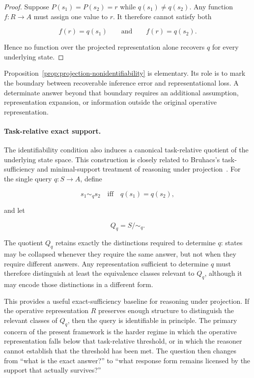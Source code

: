 \documentclass[11pt]{article}
\theoremstyle{definition}
\theoremstyle{remark}
\begin{document}
\begin{proof}
Suppose \(P(s_1)=P(s_2)=r\) while \(q(s_1)\neq q(s_2)\). Any function \(f:R\rightarrow A\) must assign one value to \(r\). It therefore cannot satisfy both

\[
f(r)=q(s_1)
\qquad\text{and}\qquad
f(r)=q(s_2).
\]

Hence no function over the projected representation alone recovers \(q\) for every underlying state.
\end{proof}

Proposition~\ref{prop:projection-nonidentifiability} is elementary. Its role is to mark the boundary between recoverable inference error and representational loss. A determinate answer beyond that boundary requires an additional assumption, representation expansion, or information outside the original operative representation.

\paragraph{Task-relative exact support.}
The identifiability condition also induces a canonical task-relative quotient of the underlying state space. This construction is closely related to Bruhacs's task-sufficiency and minimal-support treatment of reasoning under projection~\cite{Bruhacs2026Projection}. For the single query \(q:S\rightarrow A\), define

\[
s_1\sim_q s_2
\quad\text{iff}\quad
q(s_1)=q(s_2),
\]

and let

\[
Q_q=S/{\sim_q}.
\]

The quotient \(Q_q\) retains exactly the distinctions required to determine \(q\): states may be collapsed whenever they require the same answer, but not when they require different answers. Any representation sufficient to determine \(q\) must therefore distinguish at least the equivalence classes relevant to \(Q_q\), although it may encode those distinctions in a different form.

This provides a useful exact-sufficiency baseline for reasoning under projection. If the operative representation \(R\) preserves enough structure to distinguish the relevant classes of \(Q_q\), then the query is identifiable in principle. The primary concern of the present framework is the harder regime in which the operative representation falls below that task-relative threshold, or in which the reasoner cannot establish that the threshold has been met. The question then changes from ``what is the exact answer?'' to ``what response form remains licensed by the support that actually survives?''
\end{document}
